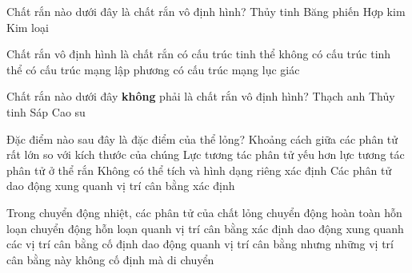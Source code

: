 \begin{ex}%
	Chất rắn nào dưới đây là chất rắn vô định hình?
	\choice
	{\True Thủy tinh}
	{Băng phiến}
	{Hợp kim}
	{Kim loại}
	\end{ex}

	\begin{ex}%
		Chất rắn vô định hình là chất rắn
		\choice
		{có cấu trúc tinh thể}
		{\True không có cấu trúc tinh thể}
		{có cấu trúc mạng lập phương}
		{có cấu trúc mạng lục giác}
		\end{ex}
	\begin{ex}%
		Chất rắn nào dưới đây \textbf{không} phải là chất rắn vô định hình?
		\choice
		{\True Thạch anh}
		{Thủy tinh}
		{Sáp}
		{Cao su}
		\end{ex}
\begin{ex}%
	Đặc điểm nào sau đây là đặc điểm của thể lỏng?	
	\choice
	{Khoảng cách giữa các phân tử rất lớn so với kích thước của chúng}
	{\True Lực tương tác phân tử yếu hơn lực tương tác phân tử ở thể rắn}
	{Không có thể tích và hình dạng riêng xác định}
	{Các phân tử dao động xung quanh vị trí cân bằng xác định}
	\end{ex}
	\begin{ex}%
		Trong chuyển động nhiệt, các phân tử của chất lỏng
		\choice
		{chuyển động hoàn toàn hỗn loạn}
		{chuyển động hỗn loạn quanh vị trí cân bằng xác định}
		{dao động xung quanh các vị trí cân bằng cố định}
		{\True dao động quanh vị trí cân bằng nhưng những vị trí cân bằng này không cố định mà di chuyển}
		\end{ex}
